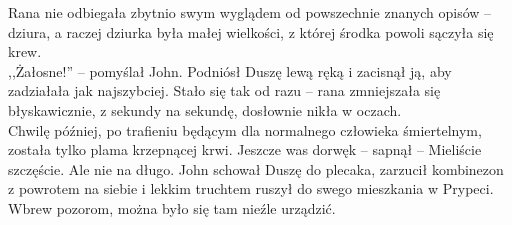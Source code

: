 \documentclass[../MAIN.tex]{subfiles}
\begin{document}
Rana nie odbiegała zbytnio swym wyglądem od powszechnie znanych opisów -- dziura, a raczej dziurka była małej wielkości, z której środka powoli sączyła się krew. \\
,,Żałosne!'' -- pomyślał John. Podniósł Duszę lewą ręką i zacisnął ją, aby zadziałała jak najszybciej. Stało się tak od razu -- rana zmniejszała się błyskawicznie, z sekundy na sekundę, dosłownie nikła w oczach. \\
Chwilę później, po trafieniu będącym dla normalnego człowieka śmiertelnym, została tylko plama krzepnącej krwi.
%
\sx Jeszcze was dorwę\3k -- sapnął -- Mieliście szczęście. Ale nie na długo.
\qd
John schował Duszę do plecaka, zarzucił kombinezon z powrotem na siebie i lekkim truchtem ruszył do swego mieszkania w Prypeci. Wbrew pozorom, można było się tam nieźle urządzić.
\end{document}
